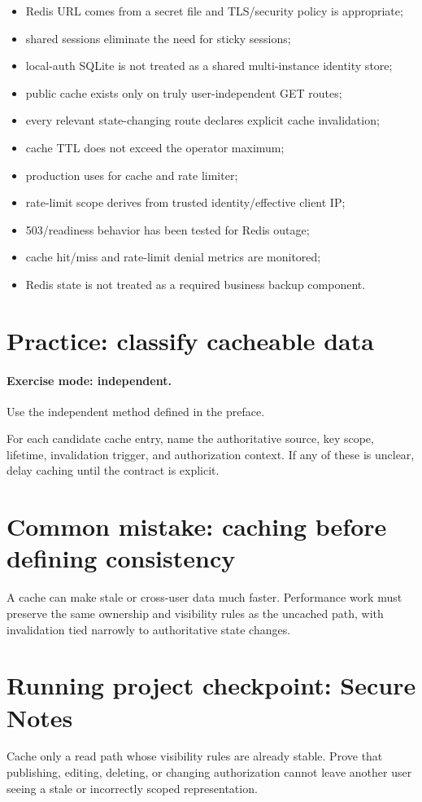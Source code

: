 \begin{itemize}
  \item Redis URL comes from a secret file and TLS/security policy is appropriate;
  \item shared sessions eliminate the need for sticky sessions;
  \item local-auth SQLite is not treated as a shared multi-instance identity store;
  \item public cache exists only on truly user-independent GET routes;
  \item every relevant state-changing route declares explicit cache invalidation;
  \item cache TTL does not exceed the operator maximum;
  \item production uses  for cache and rate limiter;
  \item rate-limit scope derives from trusted identity/effective client IP;
  \item 503/readiness behavior has been tested for Redis outage;
  \item cache hit/miss and rate-limit denial metrics are monitored;
  \item Redis state is not treated as a required business backup component.
\end{itemize}

\section{Practice: classify cacheable data}
\paragraph{Exercise mode: independent.} Use the independent method defined in the preface.

For each candidate cache entry, name the authoritative source, key scope, lifetime, invalidation trigger, and authorization context. If any of these is unclear, delay caching until the contract is explicit.

\section{Common mistake: caching before defining consistency}
A cache can make stale or cross-user data much faster. Performance work must preserve the same ownership and visibility rules as the uncached path, with invalidation tied narrowly to authoritative state changes.

\section{Running project checkpoint: Secure Notes}
Cache only a read path whose visibility rules are already stable. Prove that publishing, editing, deleting, or changing authorization cannot leave another user seeing a stale or incorrectly scoped representation.
